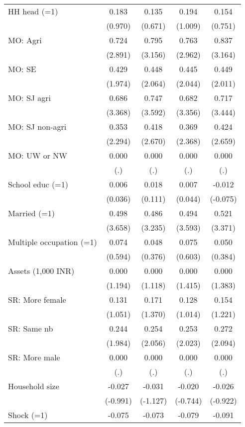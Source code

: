 \begin{longtable}{lcccc}
    HH head (=1) & 0.183 & 0.135 & 0.194 & 0.154 \\
          & (0.970) & (0.671) & (1.009) & (0.751) \\
    MO: Agri & 0.724 & 0.795 & 0.763 & 0.837 \\
          & (2.891) & (3.156) & (2.962) & (3.164) \\
    MO: SE & 0.429 & 0.448 & 0.445 & 0.449 \\
          & (1.974) & (2.064) & (2.044) & (2.011) \\
    MO: SJ agri & 0.686 & 0.747 & 0.682 & 0.717 \\
          & (3.368) & (3.592) & (3.356) & (3.444) \\
    MO: SJ non-agri & 0.353 & 0.418 & 0.369 & 0.424 \\
          & (2.294) & (2.670) & (2.368) & (2.659) \\
    MO: UW or NW & 0.000 & 0.000 & 0.000 & 0.000 \\
          & (.)   & (.)   & (.)   & (.) \\
    School educ (=1) & 0.006 & 0.018 & 0.007 & -0.012 \\
          & (0.036) & (0.111) & (0.044) & (-0.075) \\
    Married (=1) & 0.498 & 0.486 & 0.494 & 0.521 \\
          & (3.658) & (3.235) & (3.593) & (3.371) \\
    Multiple occupation (=1) & 0.074 & 0.048 & 0.075 & 0.050 \\
          & (0.594) & (0.376) & (0.603) & (0.384) \\
    Assets (1,000 INR) & 0.000 & 0.000 & 0.000 & 0.000 \\
          & (1.194) & (1.118) & (1.415) & (1.383) \\
    SR: More female & 0.131 & 0.171 & 0.128 & 0.154 \\
          & (1.051) & (1.370) & (1.014) & (1.221) \\
    SR: Same nb & 0.244 & 0.254 & 0.253 & 0.272 \\
          & (1.984) & (2.056) & (2.023) & (2.094) \\
    SR: More male & 0.000 & 0.000 & 0.000 & 0.000 \\
          & (.)   & (.)   & (.)   & (.) \\
    Household size & -0.027 & -0.031 & -0.020 & -0.026 \\
          & (-0.991) & (-1.127) & (-0.744) & (-0.922) \\
    Shock (=1) & -0.075 & -0.073 & -0.079 & -0.091 \\

\end{longtable}
